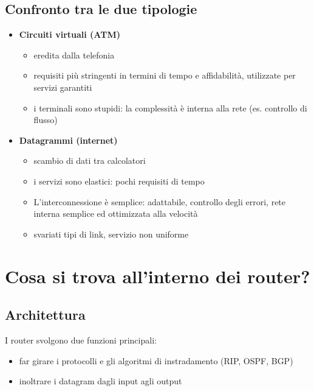 \documentclass[
]{article}
\begin{document}
\hypertarget{header-n26}{%
\subsection{Confronto tra le due tipologie}\label{header-n26}}

\begin{itemize}
\item
  \textbf{Circuiti virtuali (ATM)}

  \begin{itemize}
  \item
    eredita dalla telefonia
  \item
    requisiti più stringenti in termini di tempo e affidabilità,
    utilizzate per servizi garantiti
  \item
    i terminali sono stupidi: la complessità è interna alla rete (es.
    controllo di flusso)
  \end{itemize}
\item
  \textbf{Datagrammi (internet)}

  \begin{itemize}
  \item
    scambio di dati tra calcolatori
  \item
    i servizi sono elastici: pochi requisiti di tempo
  \item
    L'interconnessione è semplice: adattabile, controllo degli errori,
    rete interna semplice ed ottimizzata alla velocità
  \item
    svariati tipi di link, servizio non uniforme
  \end{itemize}
\end{itemize}

\hypertarget{header-n48}{%
\section{Cosa si trova all'interno dei router?}\label{header-n48}}

\hypertarget{header-n49}{%
\subsection{Architettura}\label{header-n49}}

I router svolgono due funzioni principali:

\begin{itemize}
\item
  far girare i protocolli e gli algoritmi di instradamento (RIP, OSPF,
  BGP)
\item
  inoltrare i datagram dagli input agli output
\end{itemize}
\end{document}
